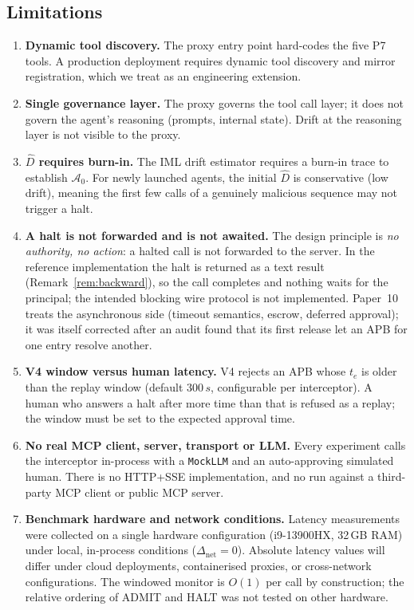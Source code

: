 \documentclass[11pt]{article}
\newcommand{\Azero}{\mathcal{A}_0}
\newcommand{\Dhat}{\widehat{D}}
\newcommand{\Dnet}{\Delta_{\mathrm{net}}}
\begin{document}
\subsection{Limitations}

\begin{enumerate}[leftmargin=2em, topsep=2pt, itemsep=2pt]
  \item \textbf{Dynamic tool discovery.}
        The proxy entry point hard-codes the five P7 tools. A production
        deployment requires dynamic tool discovery and mirror
        registration, which we treat as an engineering extension.
  \item \textbf{Single governance layer.}
        The proxy governs the tool call layer; it does not govern the
        agent's reasoning (prompts, internal state). Drift at the
        reasoning layer is not visible to the proxy.
  \item \textbf{$\Dhat$ requires burn-in.}
        The IML drift estimator requires a burn-in trace to establish
        $\Azero$. For newly launched agents, the initial $\Dhat$
        is conservative (low drift), meaning the first few calls
        of a genuinely malicious sequence may not trigger a halt.
  \item \textbf{A halt is not forwarded and is not awaited.}
        The design principle is \emph{no authority, no action}: a
        halted call is not forwarded to the server. In the reference
        implementation the halt is returned as a text result
        (Remark~\ref{rem:backward}), so the call completes and nothing
        waits for the principal; the intended blocking wire protocol is
        not implemented. Paper~10 \citep{fernandez2026nbg} treats the
        asynchronous side (timeout semantics, escrow, deferred
        approval); it was itself corrected after an audit found that
        its first release let an APB for one entry resolve another.
  \item \textbf{V4 window versus human latency.}
        V4 rejects an APB whose $t_e$ is older than the replay window
        (default $300\,\si{s}$, configurable per interceptor). A human
        who answers a halt after more time than that is refused as a
        replay; the window must be set to the expected approval time.
  \item \textbf{No real MCP client, server, transport or LLM.}
        Every experiment calls the interceptor in-process with a
        \texttt{MockLLM} and an auto-approving simulated human. There
        is no HTTP+SSE implementation, and no run against a third-party
        MCP client or public MCP server.
  \item \textbf{Benchmark hardware and network conditions.}
        Latency measurements were collected on a single hardware
        configuration (i9-13900HX, 32\,GB RAM) under local,
        in-process conditions ($\Dnet = 0$). Absolute latency values
        will differ under cloud deployments, containerised proxies,
        or cross-network configurations. The windowed monitor is $O(1)$
        per call by construction; the relative ordering of ADMIT and HALT
        was not tested on other hardware.
\end{enumerate}
\end{document}
